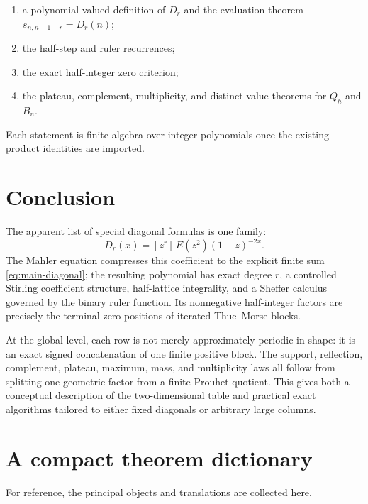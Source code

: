 \documentclass[11pt,oneside]{article}
\numberwithin{equation}{section}
\theoremstyle{definition}
\theoremstyle{remark}
\newcommand{\coeff}[2]{[z^{#1}]\,#2}
\newcommand{\Diag}{D}
\begin{document}
\begin{enumerate}
\item a polynomial-valued definition of \(\Diag_r\) and the evaluation theorem
\(s_{n,n+1+r}=\Diag_r(n)\);
\item the half-step and ruler recurrences;
\item the exact half-integer zero criterion;
\item the plateau, complement, multiplicity, and distinct-value theorems for
\(Q_h\) and \(B_n\).
\end{enumerate}

Each statement is finite algebra over integer polynomials once the existing
product identities are imported.

\section{Conclusion}

The apparent list of special diagonal formulas is one family:
\[
 \Diag_r(x)=\coeff{r}{E(z^2)(1-z)^{-2x}}.
\]
The Mahler equation compresses this coefficient to the explicit finite sum
\eqref{eq:main-diagonal}; the resulting polynomial has exact degree \(r\), a
controlled Stirling coefficient structure, half-lattice integrality, and a
Sheffer calculus governed by the binary ruler function.  Its nonnegative
half-integer factors are precisely the terminal-zero positions of iterated
Thue--Morse blocks.

At the global level, each row is not merely approximately periodic in shape:
it is an exact signed concatenation of one finite positive block.  The support,
reflection, complement, plateau, maximum, mass, and multiplicity laws all
follow from splitting one geometric factor from a finite Prouhet quotient.
This gives both a conceptual description of the two-dimensional table and
practical exact algorithms tailored to either fixed diagonals or arbitrary
large columns.

\appendix

\section{A compact theorem dictionary}

For reference, the principal objects and translations are collected here.
\end{document}
